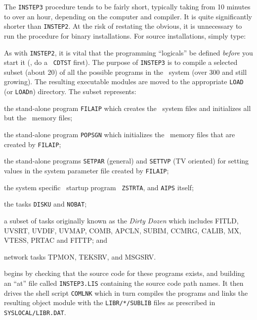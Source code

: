 

The {\tt INSTEP3} procedure tends to be fairly short, typically taking
from 10 minutes to over an hour, depending on the computer and compiler.
It is quite significantly shorter than {\tt INSTEP2}.  At the risk of
restating the obvious, it is unnecessary to run the procedure for binary
installations.  For source installations, simply type:\medskip

\medskip

\noindent As with {\tt INSTEP2}, it is vital that the programming
``logicals'' be defined {\it before\/} you start it (\ie, do a {\tt
\dol CDTST} first).  The purpose of {\tt INSTEP3} is to compile a selected
subset (about 20) of all the possible programs in the \AIPS\ system
(over 300 and still growing).  The resulting executable modules are
moved to the appropriate {\tt\dol LOAD} (or {\tt\dol LOADn}) directory.  The
subset represents:\medskip

\item\bul the stand-alone program {\tt FILAIP} which creates
        the \AIPS\ system files and initializes all but the
        \POPS\ memory files;
\item\bul the stand-alone program {\tt POPSGN} which initializes
        the \POPS\ memory files that are created by {\tt FILAIP};
\item\bul the stand-alone programs {\tt SETPAR} (general) and
        {\tt SETTVP} (TV oriented) for setting values in the system
        parameter file created by {\tt FILAIP};
\item\bul the system specific \AIPS\ startup program {\tt
        ZSTRTA}, and {\tt AIPS} itself;
\item\bul the tasks {\tt DISKU} and {\tt NOBAT};
\item\bul a subset of tasks originally known as the {\it
        Dirty Dozen\/} which includes FITLD, UVSRT, UVDIF, UVMAP,
        COMB, APCLN, SUBIM, CCMRG, CALIB, MX, VTESS, PRTAC
        and FITTP; and
\item\bul network tasks TPMON, TEKSRV, and MSGSRV.
\medskip

 begins by checking that the source code for these
programs exists, and building an ``at'' file called {\tt INSTEP3.LIS}
containing the source code path names.  It then drives the shell script
{\tt COMLNK} which in turn compiles the programs and links the resulting
object module with the {\tt\dol LIBR/*/SUBLIB} files as prescribed in
{\tt\dol SYSLOCAL/LIBR.DAT}.

